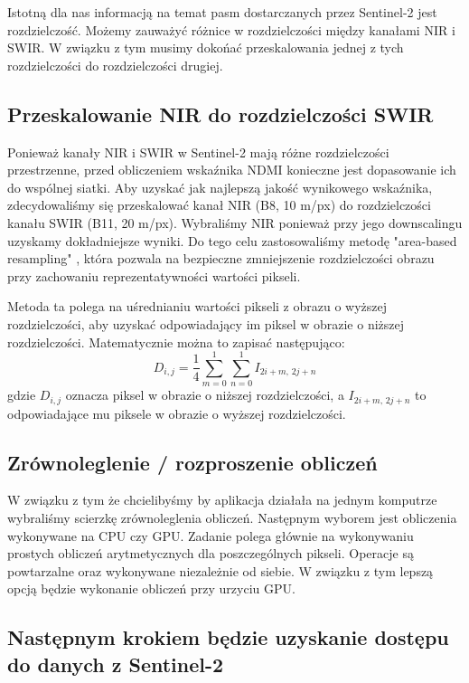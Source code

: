 \documentclass[12pt,a4paper]{article}
\begin{document}
Istotną dla nas informacją na temat pasm dostarczanych przez Sentinel-2 jest rozdzielczość. Możemy zauważyć różnice w rozdzielczości między kanałami NIR i SWIR. W związku z tym musimy dokońać przeskalowania jednej z tych rozdzielczości do rozdzielczości drugiej.

\subsection{Przeskalowanie NIR do rozdzielczości SWIR}
Ponieważ kanały NIR i SWIR w Sentinel-2 mają różne rozdzielczości przestrzenne, przed obliczeniem wskaźnika NDMI konieczne jest dopasowanie ich do wspólnej siatki. Aby uzyskać jak najlepszą jakość wynikowego wskaźnika, zdecydowaliśmy się przeskalować kanał NIR (B8, 10 m/px) do rozdzielczości kanału SWIR (B11, 20 m/px). 
Wybraliśmy NIR ponieważ przy jego downscalingu uzyskamy dokładniejsze wyniki.
Do tego celu zastosowaliśmy metodę "area-based resampling" \cite{area_based_resampling}, która pozwala na bezpieczne zmniejszenie rozdzielczości obrazu przy zachowaniu reprezentatywności wartości pikseli.

Metoda ta polega na uśrednianiu wartości pikseli z obrazu o wyższej rozdzielczości, aby uzyskać odpowiadający im piksel w obrazie o niższej rozdzielczości. Matematycznie można to zapisać następująco:
\[
D_{i,j} = \frac{1}{4} \sum_{m=0}^{1} \sum_{n=0}^{1} I_{2i+m,\,2j+n}
\]
gdzie $D_{i,j}$ oznacza piksel w obrazie o niższej rozdzielczości, a $I_{2i+m,\,2j+n}$ to odpowiadające mu piksele w obrazie o wyższej rozdzielczości.

\subsection{Zrównoleglenie / rozproszenie obliczeń}

W związku z tym że chcielibyśmy by aplikacja działała na jednym komputrze wybraliśmy scierzkę zrównoleglenia obliczeń.
Następnym wyborem jest obliczenia wykonywane na CPU czy GPU.
Zadanie polega głównie na wykonywaniu prostych obliczeń arytmetycznych dla poszczególnych pikseli.
Operacje są powtarzalne oraz wykonywane niezależnie od siebie.
W związku z tym lepszą opcją będzie wykonanie obliczeń przy urzyciu GPU.

\subsection{Następnym krokiem będzie uzyskanie dostępu do danych z Sentinel-2}
\end{document}
